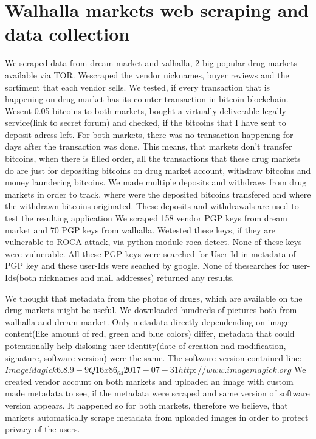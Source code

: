 \documentclass[
  digital, %
  table,   %
  lof,     %
  lot,     %
  oneside
]{fithesis3}
\begin{document}
\section{Walhalla markets web scraping and data collection}
We scraped data from dream market and valhalla, 2 big popular drug markets available via TOR. Wescraped the vendor nicknames, buyer reviews and the sortiment that each vendor sells.
We tested, if every transaction that is happening on drug market has its counter transaction in bitcoin blockchain. Wesent 0.05 bitcoins to both markets,
bought a virtually deliverable legally service(link to secret forum) and checked, if the bitcoins that I have sent to deposit adress left.
For both markets, there was no transaction happening for days after the transaction was done. This means, that markets don't transfer bitcoins,
when there is filled order, all the transactions that these drug markets do are just for depositing bitcoins on drug market account,
withdraw bitcoins and money laundering bitcoins.
We made multiple deposits and withdraws from drug markets in order to track, where were the deposited bitcoins transfered and where the withdrawn bitcoins originated.
These deposits and withdrawals are used to test the resulting application
We scraped 158 vendor PGP keys from dream market and 70 PGP keys from walhalla. Wetested these keys, if they are vulnerable to ROCA attack, via python module roca-detect. None of these keys were vulnerable.
All these PGP keys were searched for User-Id in metadata of PGP key and these user-Ids were seached by google. None of thesearches for user-Ids(both nicknames and mail addresses) returned any results.

We thought that metadata from the photos of drugs, which are available on the drug markets might be useful.
We downloaded hundreds of pictures both from walhalla and dream market.
Only metadata directly dependending on image content(like amount of red, green and blue colors) differ,
metadata that could potentionally help dislosing user identity(date of creation nad modification, signature, software version) were the same.
The software version contained line: $ImageMagick 6.8.9-9 Q16 x86_64 2017-07-31 http://www.imagemagick.org$
We created vendor account on both markets and uploaded an image with custom made metadata to see,
if the metadata were scraped and same version of software version appears. It happened so for both markets,
therefore we believe, that markets automatically scrape metadata from uploaded images in order to protect privacy of the users.
\end{document}
